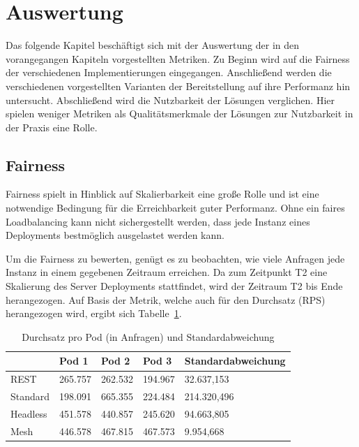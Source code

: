\newpage


\section{Auswertung}\label{sec:auswertung}

Das folgende Kapitel beschäftigt sich mit der Auswertung der in den vorangegangen Kapiteln vorgestellten Metriken.
Zu Beginn wird auf die Fairness der verschiedenen Implementierungen eingegangen.
Anschließend werden die verschiedenen vorgestellten Varianten der Bereitstellung auf ihre Performanz hin untersucht.
Abschließend wird die Nutzbarkeit der Lösungen verglichen.
Hier spielen weniger Metriken als Qualitätsmerkmale der Lösungen zur Nutzbarkeit in der Praxis eine Rolle.

\subsection{Fairness}\label{subsec:fairness}

Fairness spielt in Hinblick auf Skalierbarkeit eine große Rolle und ist eine notwendige Bedingung für die Erreichbarkeit guter Performanz.
Ohne ein faires Loadbalancing kann nicht sichergestellt werden, dass jede Instanz eines Deployments bestmöglich ausgelastet werden kann.

Um die Fairness zu bewerten, genügt es zu beobachten, wie viele Anfragen jede Instanz in einem gegebenen Zeitraum erreichen.
Da zum Zeitpunkt T2 eine Skalierung des Server Deployments stattfindet, wird der Zeitraum T2 bis Ende herangezogen.
Auf Basis der Metrik, welche auch für den Durchsatz (RPS) herangezogen wird, ergibt sich Tabelle~\ref{tab:requests}.

\begin{table}[H]
    \centering
    \begin{tabular}{|l|l|l|l|l|}
        \hline
        & Pod 1  & Pod 2  & Pod 3  & Standardabweichung \\ \hline
        REST     & 265.757 & 262.532 & 194.967 & 32.637,153          \\ \hline
        Standard & 198.091 & 665.355 & 224.484 & 214.320,496         \\ \hline
        Headless & 451.578 & 440.857 & 245.620 & 94.663,805          \\ \hline
        Mesh     & 446.578 & 467.815 & 467.573 & 9.954,668           \\ \hline
    \end{tabular}
    \caption{Durchsatz pro Pod (in Anfragen) und Standardabweichung}
    \label{tab:requests}
\end{table}

